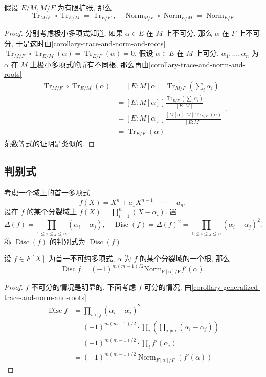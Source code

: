 \begin{proposition}
  假设 \( E/M, M/F \) 为有限扩张, 那么
  \[
    \operatorname{Tr}_{M/F} \circ \operatorname{Tr}_{E/M} =
    \operatorname{Tr}_{E/F},\quad \operatorname{Norm}_{M/F} \circ
    \operatorname{Norm}_{E/M} = \operatorname{Norm}_{E/F}
  \]
\end{proposition}
\begin{proof}
  分别考虑极小多项式知道, 如果 \( \alpha \in E \) 在 \( M \) 上不可分, 那么 \(
  \alpha \) 在 \( F \) 上不可分,
  于是这时由\cref{corollary-trace-and-norm-and-roots} \( \operatorname{Tr}_{M/F}
  \circ \operatorname{Tr}_{E/M}(\alpha) = \operatorname{Tr}_{E/F}(\alpha) = 0
  \).
  假设 \( \alpha \in E \) 在 \( M \) 上可分, \( \alpha_1, \ldots, \alpha_n \) 为
  \( \alpha \) 在 \( M \) 上极小多项式的所有不同根,
  那么再由\cref{corollary-trace-and-norm-and-roots}
  \[
    \begin{split}
      \operatorname{Tr}_{M/F} \circ \operatorname{Tr}_{E/M}(\alpha) &=
      [E:M[\alpha]] \operatorname{Tr}_{M/F}(\sum_i \alpha_i)\\ &= [E:M[\alpha]]
      \frac{\operatorname{Tr}_{E/F}(\sum_i \alpha_i)}{[E:M]}\\ &= [E:M[\alpha]]
      \frac{[M[\alpha]:M]\operatorname{Tr}_{E/F}(\alpha)}{[E:M]}\\ &=
      \operatorname{Tr}_{E/F}(\alpha)
    \end{split}.
  \]
  范数等式的证明是类似的.
\end{proof}

\subsection{判别式}

考虑一个域上的首一多项式
\[
  f(X) = X^n + a_1 X^{n - 1} + \cdots + a_n,
\]
设在 \( f \) 的某个分裂域上 \( f(X) = \prod_{i = 1}^n (X - \alpha_i) \).
置
\[
  \Delta (f) = \prod_{1 \leq i \leq j \leq n}(\alpha_i - \alpha_j),\quad
  \operatorname{Disc}(f) = \Delta(f)^2 = \prod_{1 \leq i \leq j \leq n}(\alpha_i
  - \alpha_j)^2.
\]
称 \( \operatorname{Disc}(f) \) 的判别式为 \( \operatorname{Disc}(f) \).

\begin{proposition}
  设 \( f \in F[X] \) 为首一不可约多项式, \( \alpha \) 为 \( f \)
  的某个分裂域的一个根, 那么
  \[
    \operatorname{Disc}f = (-1)^{m(m - 1)/2}
    \operatorname{Norm_{F[\alpha]/F}}f'(\alpha).
  \]
\end{proposition}
\begin{proof}
  \( f \) 不可分的情况是明显的, 下面考虑 \( f \) 可分的情况.
  由\cref{corollary-generalized-trace-and-norm-and-roots}
  \[
    \begin{split}
      \operatorname{Disc}f &= \prod_{i < j}(\alpha_i - \alpha_j)^2\\ &=
      (-1)^{m(m - 1)/2} \cdot \prod_i (\prod_{j \neq i} (\alpha_i - \alpha_j))\\
      &= (-1)^{m(m - 1)/2} \cdot \prod_{i}f'(\alpha_i)\\ &= (-1)^{m(m - 1)/2}
      \operatorname{Norm}_{F[\alpha]/F}(f'(\alpha))
    \end{split}
  \]
\end{proof}

